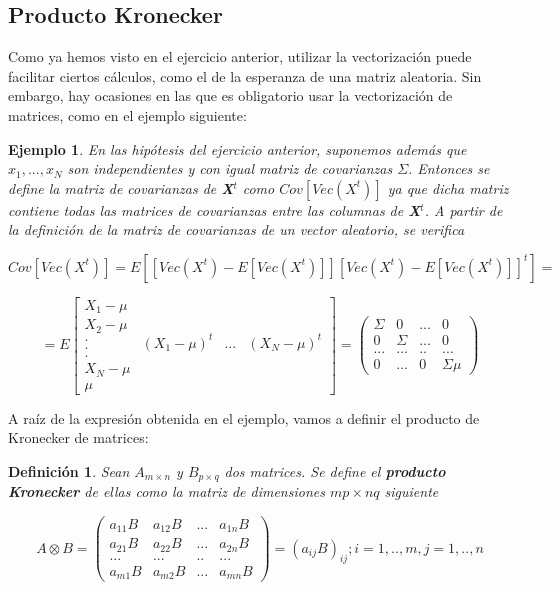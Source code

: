 \documentclass{article}
\theoremstyle{theorem-style}  %
\theoremstyle{definition-style}
\newtheorem{definition}{Definición}[section]
\theoremstyle{example-style}
\newtheorem{example}{Ejemplo}[section]
\theoremstyle{exercise-style}
\begin{document}
	
	\subsection{Producto Kronecker}
	
	Como ya hemos visto en el ejercicio anterior, utilizar la vectorización puede facilitar ciertos cálculos, como el de la esperanza de una matriz aleatoria. Sin embargo, hay ocasiones en las que es obligatorio usar la vectorización de matrices, como en el ejemplo siguiente:
	
	\begin{example}
		En las hipótesis del ejercicio anterior, suponemos además que $x_1, ..., x_N$ son independientes y con igual matriz de covarianzas $\Sigma$. Entonces se define la matriz de covarianzas de \textbf{X}$^t$ como $Cov[Vec(X^t)]$ ya que dicha matriz contiene todas las matrices de covarianzas entre las columnas de \textbf{X}$^t$. A partir de la definición de la matriz de covarianzas de un vector aleatorio, se verifica
		
		$$Cov[Vec(X^t)] = E[[Vec(X^t)  - E[Vec(X^t)]] [Vec(X^t) - E[Vec(X^t)]]^t] = $$
		
		
		$$=E \left[{\begin{array}{c}
			X_1 - \mu\\
			X_2 - \mu\\
			.\\
			.\\
			.\\
			X_N - \mu\\
			\mu
			\end{array}}{\begin{array}{ccc}
			(X_1 - \mu)^t & ... &	(X_N- \mu)^t\\
			\end{array} }\right] =	 \left( {\begin{array}{cccc}
			\Sigma & 0 & ... & 0\\
			0 & \Sigma & ... & 0\\
			... & ... & .. & ... \\
			0 & ... & 0 & \Sigma\mu
			\end{array}}\right) $$
		
	\end{example}
	
	A raíz de la expresión obtenida en el ejemplo, vamos a definir el producto de Kronecker de matrices:
	
	\begin{definition}
		Sean $A_{m \times n}$ y $B_{p \times q}$ dos matrices. Se define el \textbf{producto Kronecker} de ellas como la matriz de dimensiones $mp \times nq$ siguiente
		
		$$A \otimes B =  \left( {\begin{array}{cccc}
			a_{11}B & a_{12}B & ... & a_{1n}B\\
			a_{21}B & a_{22}B & ... & a_{2n}B\\
			... & ... & .. & ... \\
			a_{m1}B & a_{m2}B  & ... & a_{mn}B
			\end{array}}\right) = (a_{ij}B)_{ij} ; i = 1,.., m, j = 1,.., n$$
		
	\end{definition}
	
\end{document}

